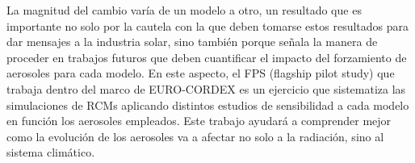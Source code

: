 La magnitud del cambio varía de un modelo a otro, un resultado que es importante no solo por la cautela con la que deben tomarse estos resultados para dar mensajes a la industria solar, sino también porque señala la manera de proceder en trabajos futuros que deben cuantificar el impacto del forzamiento de aerosoles para cada modelo. En este aspecto, el FPS (flagship pilot study) que trabaja dentro del marco de EURO-CORDEX es un ejercicio que sistematiza las simulaciones de RCMs aplicando distintos estudios de sensibilidad a cada modelo en función los aerosoles empleados. Este trabajo ayudará a comprender mejor como la evolución de los aerosoles va a afectar no solo a la radiación, sino al sistema climático.
